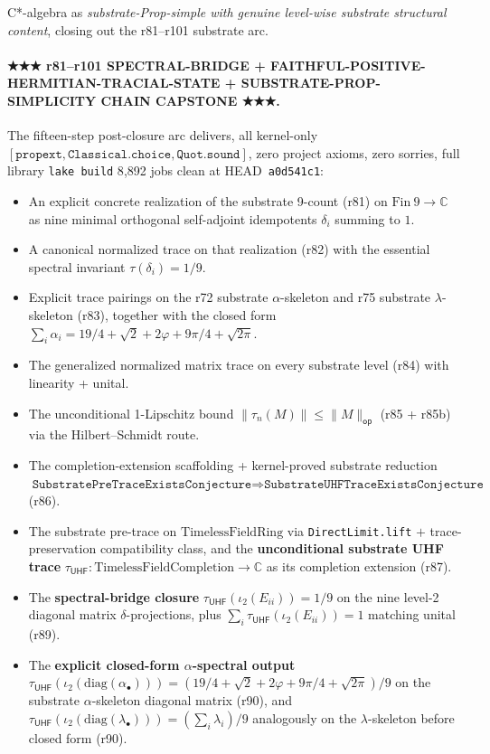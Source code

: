 \documentclass[11pt,a4paper]{amsart}
\theoremstyle{plain}
\theoremstyle{definition}
\begin{document}
C*-algebra as \emph{substrate-Prop-simple with genuine level-wise substrate structural content}, closing out the r81--r101 substrate arc.

\paragraph{★★★ r81--r101 SPECTRAL-BRIDGE + FAITHFUL-POSITIVE-HERMITIAN-TRACIAL-STATE + SUBSTRATE-PROP-SIMPLICITY CHAIN CAPSTONE ★★★.} The fifteen-step post-closure arc delivers, all kernel-only $[\texttt{propext}, \texttt{Classical.choice}, \texttt{Quot.sound}]$, zero project axioms, zero sorries, full library \texttt{lake build} 8{,}892 jobs clean at HEAD~\texttt{a0d541c1}:
\begin{itemize}[itemsep=2pt,leftmargin=2em]
\item An explicit concrete realization of the substrate 9-count (r81) on $\mathrm{Fin}~9 \to \mathbb{C}$ as nine minimal orthogonal self-adjoint idempotents $\delta_i$ summing to $1$.
\item A canonical normalized trace on that realization (r82) with the essential spectral invariant $\tau(\delta_i) = 1/9$.
\item Explicit trace pairings on the r72 substrate $\alpha$-skeleton and r75 substrate $\lambda$-skeleton (r83), together with the closed form $\sum_i \alpha_i = 19/4 + \sqrt{2} + 2\varphi + 9\pi/4 + \sqrt{2\pi}$.
\item The generalized normalized matrix trace on every substrate level (r84) with linearity + unital.
\item The unconditional 1-Lipschitz bound $\|\tau_n(M)\| \le \|M\|_{\textsf{op}}$ (r85 + r85b) via the Hilbert--Schmidt route.
\item The completion-extension scaffolding + kernel-proved substrate reduction $\texttt{SubstratePreTraceExistsConjecture} \Rightarrow \texttt{SubstrateUHFTraceExistsConjecture}$ (r86).
\item The substrate pre-trace on $\mathrm{TimelessFieldRing}$ via \texttt{DirectLimit.lift} $+$ trace-preservation compatibility class, and the \textbf{unconditional substrate UHF trace} $\tau_{\textsf{UHF}} \colon \mathrm{TimelessFieldCompletion} \to \mathbb{C}$ as its completion extension (r87).
\item The \textbf{spectral-bridge closure} $\tau_{\textsf{UHF}}(\iota_2(E_{ii})) = 1/9$ on the nine level-2 diagonal matrix $\delta$-projections, plus $\sum_i \tau_{\textsf{UHF}}(\iota_2(E_{ii})) = 1$ matching unital (r89).
\item The \textbf{explicit closed-form $\alpha$-spectral output} $\tau_{\textsf{UHF}}(\iota_2(\mathrm{diag}(\alpha_\bullet))) = (19/4 + \sqrt{2} + 2\varphi + 9\pi/4 + \sqrt{2\pi})/9$ on the substrate $\alpha$-skeleton diagonal matrix (r90), and $\tau_{\textsf{UHF}}(\iota_2(\mathrm{diag}(\lambda_\bullet))) = (\sum_i \lambda_i)/9$ analogously on the $\lambda$-skeleton before closed form (r90).

\end{itemize}
\end{document}
